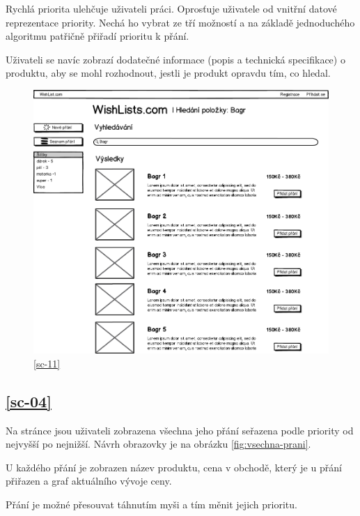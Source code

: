 Rychlá priorita ulehčuje uživateli práci. Oprosťuje uživatele od vnitřní datové reprezentace priority. Nechá ho vybrat ze tří možností a na základě jednoduchého algoritmu patřičně přiřadí prioritu k přání.

Uživateli se navíc zobrazí dodatečné informace (popis a technická specifikace) o produktu, aby se mohl rozhodnout, jestli je produkt opravdu tím, co hledal.

\begin{figure}[htb]
\begin{center}
\includegraphics[width=130mm]{./pictures/mock/vysledky-hledani.png}
\caption{\ref{sc-11}}
\label{fig:formular-pridani-prani}
\end{center}
\end{figure}

\subsection{\ref{sc-04}}
Na stránce jsou uživateli zobrazena všechna jeho přání seřazena podle priority od nejvyšší po nejnižší. Návrh obrazovky je na obrázku \ref{fig:vsechna-prani}.

U každého přání je zobrazen název produktu, cena v obchodě, který je u přání přiřazen a graf aktuálního vývoje ceny.

Přání je možné přesouvat táhnutím myši a tím měnit jejich prioritu.

